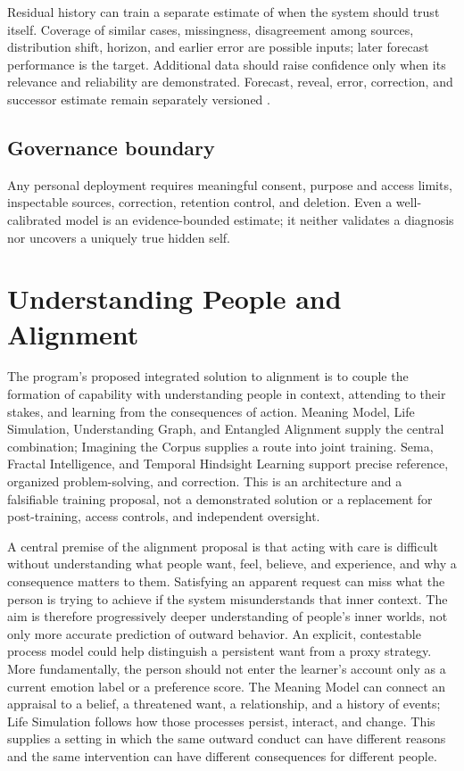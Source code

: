 \documentclass[10pt]{article}
\begin{document}
Residual history can train a separate estimate of when the system should trust
itself. Coverage of similar cases, missingness, disagreement among sources,
distribution shift, horizon, and earlier error are possible inputs; later
forecast performance is the target. Additional data should raise confidence
only when its relevance and reliability are demonstrated. Forecast, reveal,
error, correction, and successor estimate remain separately versioned
\cite{gneitingRaftery2007,tashman2000}.

\subsection{Governance boundary}

Any personal deployment requires meaningful consent, purpose and access limits,
inspectable sources, correction, retention control, and deletion. Even a
well-calibrated model is an evidence-bounded estimate; it neither validates a
diagnosis nor uncovers a uniquely true hidden self.

\section{Understanding People and Alignment}
\label{sec:alignment}

The program's proposed integrated solution to alignment is to couple the
formation of capability with understanding people in context, attending to
their stakes, and learning from the consequences of action. Meaning Model,
Life Simulation, Understanding Graph, and Entangled Alignment supply the
central combination; Imagining the Corpus supplies a route into joint
training. Sema, Fractal Intelligence, and Temporal Hindsight Learning support
precise reference, organized problem-solving, and correction. This is an
architecture and a falsifiable training proposal, not a demonstrated solution
or a replacement for post-training, access controls, and independent oversight.

A central premise of the alignment proposal is that acting with care is
difficult without understanding what people want, feel, believe, and experience,
and why a consequence matters to them. Satisfying an apparent request can miss
what the person is trying to achieve if the system misunderstands that inner
context. The aim is therefore progressively deeper understanding of people's
inner worlds, not only more accurate prediction of outward behavior.
An explicit, contestable process model could help distinguish a persistent
want from a proxy strategy. More fundamentally, the person should not enter
the learner's account only as a current emotion label or a preference score.
The Meaning Model can connect an appraisal to a belief, a threatened want, a
relationship, and a history of events; Life Simulation follows how those
processes persist, interact, and change. This supplies a setting in which the
same outward conduct can have different reasons and the same intervention can
have different consequences for different people.
\end{document}
